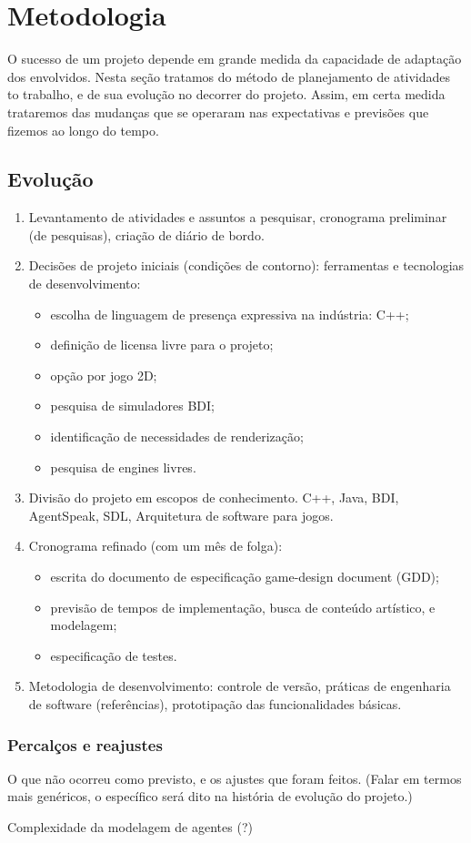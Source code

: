 \chapter{Metodologia}

O sucesso de um projeto depende em grande medida da capacidade de
adaptação dos envolvidos. Nesta seção tratamos do método de
planejamento de atividades to trabalho, e de sua evolução no decorrer
do projeto. Assim, em certa medida trataremos das mudanças que se
operaram nas expectativas e previsões que fizemos ao longo do tempo.

\section{Evolução}

\begin{enumerate}
\item Levantamento de atividades e assuntos a pesquisar, cronograma
  preliminar (de pesquisas), criação de diário de bordo.%

\item Decisões de projeto iniciais (condições de contorno): ferramentas e
tecnologias de desenvolvimento:
\begin{itemize}
\item  escolha de linguagem de presença expressiva na indústria: C++;
\item  definição de licensa livre para o projeto;
\item  opção por jogo 2D;
\item  pesquisa de simuladores BDI;
\item  identificação de necessidades de renderização;
\item  pesquisa de engines livres.
\end{itemize}%

\item Divisão do projeto em escopos de conhecimento. C++, Java, BDI,
AgentSpeak, SDL, Arquitetura de software para jogos.%

\item Cronograma refinado (com um mês de folga): 
\begin{itemize}
\item escrita do documento de especificação game-design document (GDD);
\item previsão de tempos de implementação, 
  busca de conteúdo artístico, e modelagem;
\item especificação de testes.
\end{itemize}

\item Metodologia de desenvolvimento: controle de versão, práticas de
engenharia de software (referências), prototipação das funcionalidades básicas.
\end{enumerate}

\subsection{Percalços e reajustes}

O que não ocorreu como previsto, e os ajustes que foram feitos. (Falar
em termos mais genéricos, o específico será dito na história de
evolução do projeto.)

Complexidade da modelagem de agentes (?)

